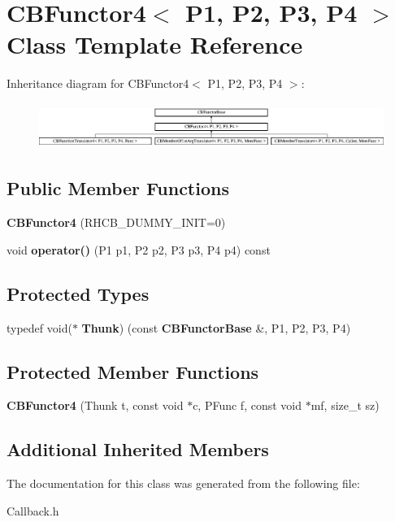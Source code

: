 \section{C\+B\+Functor4$<$ P1, P2, P3, P4 $>$ Class Template Reference}
\label{classCBFunctor4}
Inheritance diagram for C\+B\+Functor4$<$ P1, P2, P3, P4 $>$\+:\begin{figure}[H]
\begin{center}
\leavevmode
\includegraphics[height=1.497326cm]{classCBFunctor4}
\end{center}
\end{figure}
\subsection*{Public Member Functions}
\begin{DoxyCompactItemize}
\item 
{\bfseries C\+B\+Functor4} (R\+H\+C\+B\+\_\+\+D\+U\+M\+M\+Y\+\_\+\+I\+N\+IT=0)\label{classCBFunctor4_ab9f1fe157970957cfd384ee87df43e7d}

\item 
void {\bfseries operator()} (P1 p1, P2 p2, P3 p3, P4 p4) const \label{classCBFunctor4_a11b13f6aec932f356744e591b9bddb78}

\end{DoxyCompactItemize}
\subsection*{Protected Types}
\begin{DoxyCompactItemize}
\item 
typedef void($\ast$ {\bfseries Thunk}) (const {\bf C\+B\+Functor\+Base} \&, P1, P2, P3, P4)\label{classCBFunctor4_a39760d7f6823b11e09bfeb34944ff57d}

\end{DoxyCompactItemize}
\subsection*{Protected Member Functions}
\begin{DoxyCompactItemize}
\item 
{\bfseries C\+B\+Functor4} (Thunk t, const void $\ast$c, P\+Func f, const void $\ast$mf, size\+\_\+t sz)\label{classCBFunctor4_a93c1195373bbd68970b079681b4df68b}

\end{DoxyCompactItemize}
\subsection*{Additional Inherited Members}


The documentation for this class was generated from the following file\+:\begin{DoxyCompactItemize}
\item 
Callback.\+h\end{DoxyCompactItemize}
